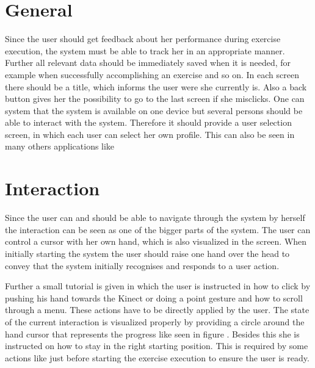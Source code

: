 \section{General}\label{4_2_general}
Since the user should get feedback about her performance during exercise execution, the system must be able to track her in an appropriate manner. Further all relevant data should be immediately saved when it is needed, for example when successfully accomplishing an exercise and so on. %
In each screen there should be a title, which informs the user were she currently is. Also a back button gives her the possibility to go to the last screen if she misclicks. One can system that the system is available on one device but several persons should be able to interact with the system. Therefore it should provide a user selection screen, in which each user can select her own profile. This can also be seen in many others applications like \todo{[CITE]}

\section{Interaction}\label{4_3_interaction}
Since the user can and should be able to navigate through the system by herself the interaction can be seen as one of the bigger parts of the system. The user can control a cursor with her own hand, which is also visualized in the screen. When initially starting the system the user should raise one hand over the head to convey that the system initially recognises and responds to a user action. 

Further a small tutorial is given in which the user is instructed in how to click by pushing his hand towards the Kinect or doing a point gesture and how to scroll through a menu. These actions have to be directly applied by the user. The state of the current interaction is visualized properly by providing a circle around the hand cursor that represents the progress like seen in figure . Besides this she is instructed on how to stay in the right starting position. This is required by some actions like just before starting the exercise execution to ensure the user is ready.

